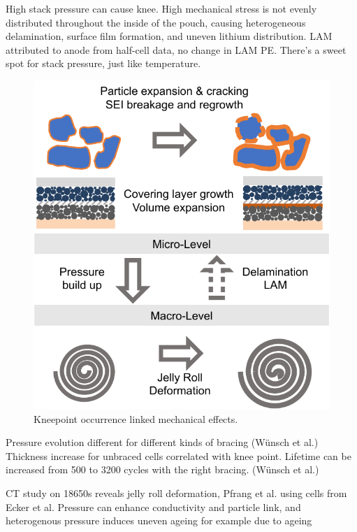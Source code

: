 \documentclass{article}
\begin{document}
High stack pressure can cause knee. High mechanical stress is not evenly distributed throughout the inside of the pouch, causing heterogeneous delamination, surface film formation, and uneven lithium distribution. LAM attributed to anode from half-cell data, no change in LAM PE. There's a sweet spot for stack pressure, just like temperature.\cite{cannarella_stress_2014}

\begin{figure}[ht]
\centering
\includegraphics[scale = 0.7]{figures/MechanicalKneepoints.pdf}
\caption{Kneepoint occurrence linked mechanical effects.}
\label{fig:knee_mechanical}
\end{figure}

Pressure evolution different for different kinds of bracing (Wünsch et al.) Thickness increase for unbraced cells correlated with knee point. Lifetime can be increased from 500 to 3200 cycles with the right bracing. (Wünsch et al.)

CT study on 18650s reveals jelly roll deformation, Pfrang et al. \cite{pfrang_long-term_2018} using cells from Ecker et al. \cite{ecker_calendar_2014}
Pressure can enhance conductivity and particle link, and heterogenous pressure induces uneven ageing for example due to ageing \cite{bach_nonlinear_2016}
\end{document}
